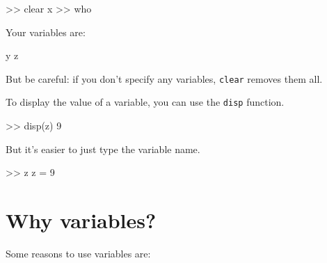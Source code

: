 \documentclass[
]{book}
\numberwithin{Answer}{chapter}
\numberwithin{Exercise}{chapter}
\begin{document}
\begin{code}
>> clear x
>> who

Your variables are:

y z
\end{code}

But be careful: if you don't specify any variables, {\tt clear} removes them all.

To display the value of a variable, you can use the {\tt disp} function.


\begin{code}
>> disp(z)
     9
\end{code}

But it's easier to just type the variable name.

\begin{code}
>> z
z = 9
\end{code}


\section{Why variables?}

Some reasons to use variables are:
\end{document}
